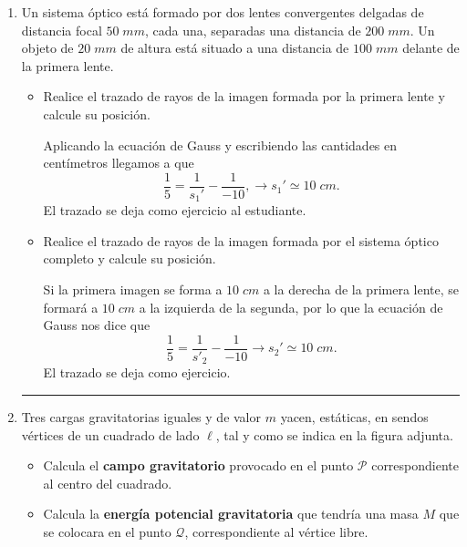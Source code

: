 \documentclass[a4paper,14pt]{exam}
\newcommand{\halmos}{\vspace*{-7mm}
	
					\begin{flushright}
						\rule{1mm}{2.5mm} 
					\end{flushright}\vspace*{-6mm}
						
					  }
\renewcommand{\qed}{\halmos}
\begin{document}
\begin{enumerate}
	

	
	
	
	\item 	 Un sistema óptico está formado por dos lentes convergentes delgadas de
distancia focal $50\;mm$, cada una, separadas una distancia de $200\;mm$. Un objeto de $20\;mm$ de
altura está situado a una distancia de $100\;mm$ delante de la primera lente.
			\begin{itemize}
				\item[a)] Realice el trazado de rayos de la imagen formada por la primera lente y calcule su posición.
				\begin{mdframed}[backgroundcolor=brown!10]  
				Aplicando la ecuación de Gauss y escribiendo las cantidades en centímetros llegamos a que 
				\[\frac{1}{5}=\frac{1}{s_1'}-\frac{1}{-10},\rightarrow s_1'\simeq 10\;cm.\]
				El trazado se deja como ejercicio al estudiante.
				\end{mdframed}
				\item[b)] Realice el trazado de rayos de la imagen formada por el sistema óptico completo y calcule su posición.
				\begin{mdframed}[backgroundcolor=brown!10]  
				Si la primera imagen se forma a $10\;cm$ a la derecha de la primera lente, se formará a $10\;cm$ a la izquierda de la segunda, por lo que la ecuación de Gauss nos dice que
				\[\frac{1}{5}=\frac{1}{s'_2}-\frac{1}{-10}\rightarrow s_2'\simeq 10\;cm.\]
				El trazado se deja como ejercicio.
				\end{mdframed}
			\end{itemize}
	\qed
	
	
\newpage
{}	

		
		\item Tres cargas gravitatorias iguales y de valor $m$ yacen, estáticas, en sendos vértices de un cuadrado de lado $\ell$, tal y como se indica en la figura adjunta. 
	
 		\begin{minipage}{.7\linewidth}
 		\begin{itemize}
			\item[a)] Calcula el \textbf{campo gravitatorio} provocado en el punto $\mathcal{P}$ correspondiente al centro del cuadrado.
			
			\item[b)] Calcula la \textbf{energía potencial gravitatoria} que tendría una masa $M$ que se colocara en el punto $\mathcal{Q}$, correspondiente al vértice libre.
			\vspace{.1ex}
						

\end{itemize}
\end{minipage}
\end{enumerate}
\end{document}
